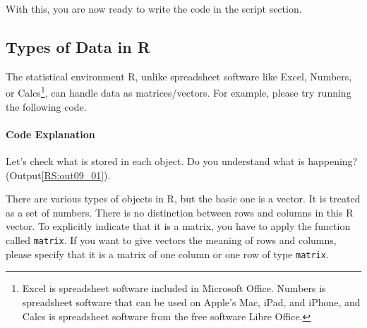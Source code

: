 \documentclass{ltjsbook}
\begin{document}
With this, you are now ready to write the code in the script section.
\subsection{Types of Data in R}
The statistical environment R, unlike spreadsheet software like Excel, Numbers, or Calcs\footnote{Excel is spreadsheet software included in Microsoft Office. Numbers is spreadsheet software that can be used on Apple's Mac, iPad, and iPhone, and Calcs is spreadsheet software from the free software Libre Office.}, can handle data as matrices/vectors. For example, please try running the following code.



\paragraph{Code Explanation}


Let's check what is stored in each object. Do you understand what is happening?
(Output\ref{RS:out09_01}).



There are various types of objects in R, but the basic one is a vector. It is treated as a set of numbers. There is no distinction between rows and columns in this R vector.
To explicitly indicate that it is a matrix, you have to apply the function called \texttt{matrix}. If you want to give vectors the meaning of rows and columns, please specify that it is a matrix of one column or one row of type \texttt{matrix}.
\end{document}
